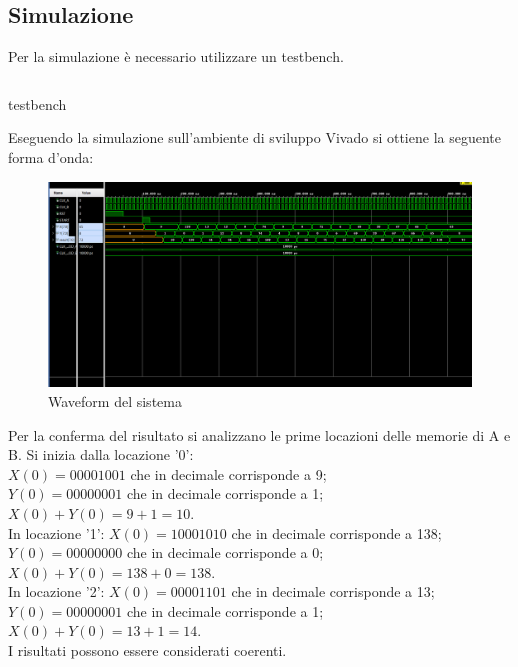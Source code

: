 \subsection{Simulazione}
Per la simulazione è necessario utilizzare un testbench.
\begin{code}
    \inputminted[frame=lines, framesep=2mm, baselinestretch=1.2, bgcolor=LightGray, fontsize=\footnotesize, linenos]{vhdl}{vhdl_files/handshaking/testbench.vhd}
    \caption{testbench}
    \label{lbl:ROMC}
\end{code}
Eseguendo la simulazione sull'ambiente di sviluppo Vivado si ottiene la seguente forma d'onda:
\begin{figure}[H]
	\centering
	\includegraphics[width=1\textwidth]{img/handshaking/waveform_handshaking}
	\caption{Waveform del sistema}
	\label{test1} 
\end{figure}
Per la conferma del risultato si analizzano le prime locazioni delle memorie di A e B. Si inizia dalla locazione '0':\\
$X(0) = 00001001 $ che in decimale corrisponde a 9;\\
$Y(0) = 00000001$ che in decimale corrisponde a 1;\\
$X(0) + Y(0) = 9 + 1 = 10$.\\
In locazione '1':
$X(0) = 10001010 $ che in decimale corrisponde a 138;\\
$Y(0) = 00000000$ che in decimale corrisponde a 0;\\
$X(0) + Y(0) = 138 + 0 = 138$.\\
In locazione '2':
$X(0) = 00001101 $ che in decimale corrisponde a 13;\\
$Y(0) = 00000001$ che in decimale corrisponde a 1;\\
$X(0) + Y(0) = 13 + 1 = 14$.\\
I risultati possono essere considerati coerenti.
